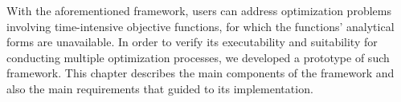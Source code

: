 With the aforementioned framework, users can address optimization problems involving time-intensive objective functions, for which the functions' analytical forms are unavailable. In order to verify its executability and suitability for conducting multiple optimization processes, we developed a prototype of such framework. This chapter describes the main components of the framework and also the main requirements that guided to its implementation. 

 



